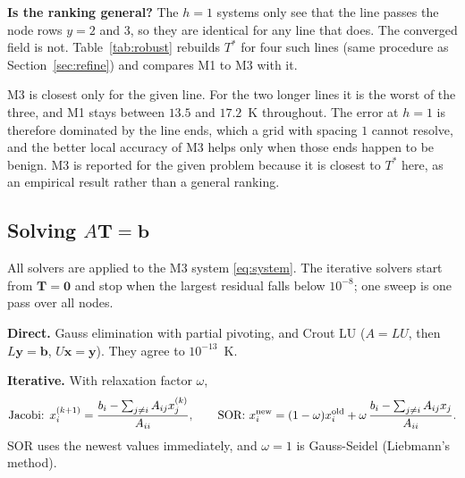 \textbf{Is the ranking general?} The $h=1$ systems only see that the line passes the node rows $y=2$ and $3$, so they are
identical for any line that does. The converged field is not. Table~\ref{tab:robust} rebuilds $T^*$ for four such lines
(same procedure as Section~\ref{sec:refine}) and compares M1 to M3 with it.
\begin{table}[H]
\centering\small

\caption{Maximum deviation [K] of M1 to M3 from the reference $T^*$ rebuilt for each line $x=1.5$, $y\in[y_{lo},y_{hi}]$.
The first row is the given problem. Bold: smallest in the row.}
\label{tab:robust}
\end{table}
M3 is closest only for the given line. For the two longer lines it is the worst of the three, and M1 stays between $13.5$ and
$17.2$~K throughout. The error at $h=1$ is therefore dominated by the line ends, which a grid with spacing $1$ cannot
resolve, and the better local accuracy of M3 helps only when those ends happen to be benign. M3 is reported for the given
problem because it is closest to $T^*$ here, as an empirical result rather than a general ranking.

\subsection{Solving \texorpdfstring{$A\mathbf T=\mathbf b$}{A T = b}}

All solvers are applied to the M3 system \eqref{eq:system}. The iterative solvers start from $\mathbf T=\mathbf 0$ and stop
when the largest residual falls below $10^{-8}$; one sweep is one pass over all nodes.

\textbf{Direct.} Gauss elimination with partial pivoting, and Crout LU ($A=LU$, then $L\mathbf y=\mathbf b$,
$U\mathbf x=\mathbf y$). They agree to $10^{-13}$~K.

\textbf{Iterative.} With relaxation factor $\omega$,
\begin{equation}
  \text{Jacobi: } x_i^{(k+1)}=\frac{b_i-\sum_{j\ne i}A_{ij}x_j^{(k)}}{A_{ii}},\qquad
  \text{SOR: } x_i^{\rm new}=(1-\omega)x_i^{\rm old}+\omega\,\frac{b_i-\sum_{j\ne i}A_{ij}x_j}{A_{ii}}.
\end{equation}
SOR uses the newest values immediately, and $\omega=1$ is Gauss-Seidel (Liebmann's method).

\begin{table}[H]
\centering\small

\caption{Solvers on the $9\times9$ system of M3. The residual factor is the mean reduction of $\|\mathbf b-A\mathbf x\|_\infty$
per sweep over the second half of the iteration history.}
\label{tab:solvers}
\end{table}

